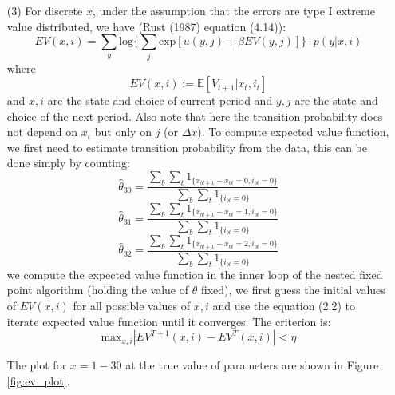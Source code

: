 \documentclass[paper=a4, fontsize=11pt]{scrartcl} %
\numberwithin{equation}{section} %
\numberwithin{figure}{section} %
\numberwithin{table}{section} %
\begin{document}
\begin{itemize}
\begin{itemize}
\item[(3)]
For discrete $x$, under the assumption that the errors are type I extreme value distributed, we have (Rust (1987) equation (4.14)):
\[EV(x,i) = \sum_y \text{log} \{\sum_{j} \text{exp}[u(y,j)+\beta EV(y,j)]\}\cdot p(y|x,i)\tag{2.2}\]
where
\[EV(x,i) := \mathbb{E}[V_{t+1}|x_t,i_t]\]
and $x, i$ are the state and choice of current period and $y,j$ are the state and choice of the next period. Also note that here the transition probability does not depend on $x_t$ but only on $j$ (or $\Delta x$). To compute expected value function, we first need to estimate transition probability from the data, this can be done simply by counting:
\[\hat{\theta}_{30} = \frac{\sum_{b}\sum_{t} 1_{\{x_{bt+1}-x_{bt}=0, i_{bt}=0\}}}{\sum_{b}\sum_{t} 1_{\{i_{bt}=0\}}}\]
\[\hat{\theta}_{31} = \frac{\sum_{b}\sum_{t} 1_{\{x_{bt+1}-x_{bt}=1, i_{bt}=0\}}}{\sum_{b}\sum_{t} 1_{\{i_{bt}=0\}}}\]
\[\hat{\theta}_{32} = \frac{\sum_{b}\sum_{t} 1_{\{x_{bt+1}-x_{bt}=2, i_{bt}=0\}}}{\sum_{b}\sum_{t} 1_{\{i_{bt}=0\}}}\]
we compute the expected value function in the inner loop of the nested fixed point algorithm (holding the value of $\theta$ fixed), we first guess the initial values of $EV(x,i)$ for all possible values of $x,i$ and use the equation (2.2) to iterate expected value function until it converges. The criterion is:
\[\text{max}_{x,i}|EV^{T+1}(x,i)-EV^T(x,i)|<\eta\]

The plot for $x=1-30$ at the true value of parameters are shown in Figure \ref{fig:ev_plot}.


\end{itemize}
\end{itemize}
\end{document}
